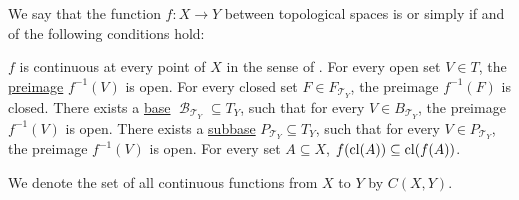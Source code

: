 \begin{definition}\label{def:global_continuity}
  We say that the function \( f: X \to Y \) between topological spaces is  or simply  if and of the following conditions hold:
  \begin{thmenum}
     \( f \) is continuous at every point of \( X \) in the sense of .
     For every open set \( V \in T \), the \hyperref[thm:def:function/preimage]{preimage} \( f^{-1}(V) \) is open.
     For every closed set \( F \in F_{\mscrT_Y} \), the preimage \( f^{-1}(F) \) is closed.
     There exists a \hyperref[def:topological_base]{base} \( \mscrB_{\mscrT_Y} \subseteq T_Y \), such that for every \( V \in B_{\mscrT_Y} \), the preimage \( f^{-1}(V) \) is open.
     There exists a \hyperref[def:topological_subbase]{subbase} \( P_{\mscrT_Y} \subseteq T_Y \), such that for every \( V \in P_{\mscrT_Y} \), the preimage \( f^{-1}(V) \) is open.
     For every set \( A \subseteq X \), \( f(\operatorname{cl}(A)) \subseteq \operatorname{cl}(f(A)) \).
  \end{thmenum}

  We denote the set of all continuous functions from \( X \) to \( Y \) by \( C(X, Y) \).
\end{definition}
